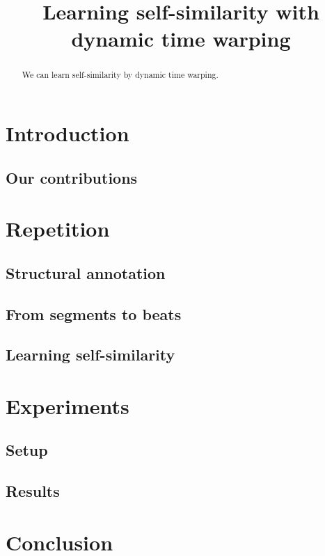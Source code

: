 \documentclass{article}
\title{Learning self-similarity with dynamic time warping}
\begin{document}
%
\maketitle
%
\begin{abstract}
We can learn self-similarity by dynamic time warping.
\end{abstract}
%
\section{Introduction}
\label{sec:introduction}

\subsection{Our contributions}

\section{Repetition}

\subsection{Structural annotation}

\subsection{From segments to beats}

\subsection{Learning self-similarity}

\section{Experiments}

\cite{smith2011design}

\subsection{Setup}

\subsection{Results}

\section{Conclusion}


\end{document}
